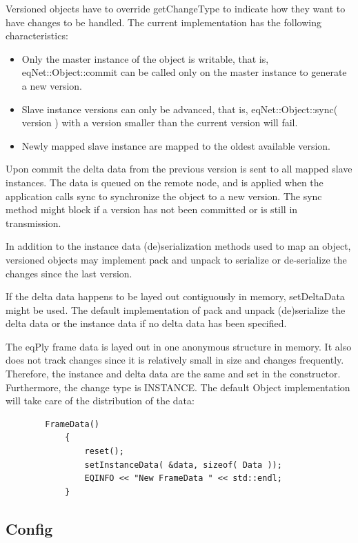 \documentclass[10pt,a4]{scrartcl}
\begin{document}
Versioned objects have to override \textsf{getChangeType} to indicate
how they want to have changes to be handled. The current
implementation has the following characteristics:
\begin{itemize}
\item Only the master instance of the object is writable, that is,
  \textsf{eqNet::Object::com\-mit} can be called only on the master
  instance to generate a new version.
\item Slave instance versions can only be advanced, that is,
  \textsf{eqNet::Object::sync( version )} with a version smaller than
  the current version will fail.
\item Newly mapped slave instance are mapped to the oldest available
  version.
\end{itemize}

Upon \textsf{commit} the delta data from the previous version is sent to
all mapped slave instances. The data is queued on the remote node, and
is applied when the application calls \textsf{sync} to synchronize the
object to a new version. The \textsf{sync} method might block if a
version has not been committed or is still in transmission.

In addition to the instance data (de)serialization methods used to map
an object, versioned objects may implement \textsf{pack} and
\textsf{unpack} to serialize or de-serialize the changes since the last
version.

If the delta data happens to be layed out contiguously in memory,
\textsf{setDeltaData} might be used. The default implementation of
\textsf{pack} and \textsf{unpack} (de)serialize the delta data or the
instance data if no delta data has been specified.

The \textsf{eqPly} frame data is layed out in one anonymous structure in
memory. It also does not track changes since it is relatively small in
size and changes frequently. Therefore, the instance and delta data are
the same and set in the constructor. Furthermore, the change type is
\textsf{INSTANCE}. The default \textsf{Object} implementation will take
care of the distribution of the data:

{\footnotesize\begin{lstlisting}
        FrameData()
            {
                reset();
                setInstanceData( &data, sizeof( Data ));
                EQINFO << "New FrameData " << std::endl;
            }
\end{lstlisting}}%

\subsection{Config}
\end{document}
